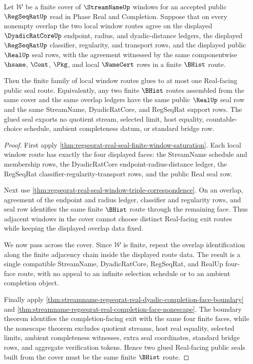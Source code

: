 \begin{theorem}
\label{thm:regseqrat-finite-cover-real-seal-gluing-uniqueness}
Let $\mathcal{W}$ be a finite cover of $\StreamNameUp$ windows for an
accepted public $\RegSeqRatUp$ read in Phase Real and Completion. Suppose
that on every nonempty overlap the two local window routes agree on the
displayed $\DyadicRatCoreUp$ endpoint, radius, and dyadic-distance ledgers,
the displayed $\RegSeqRatUp$ classifier, regularity, and transport rows, and
the displayed public $\RealUp$ seal rows, with the agreement witnessed by the
same componentwise $\hsame$, $\Cont$, $\Pkg$, and local $\NameCert$ rows in a
finite $\BHist$ route.

Then the finite family of local window routes glues to at most one
Real-facing public seal route. Equivalently, any two finite $\BHist$ routes
assembled from the same cover and the same overlap ledgers have the same
public $\RealUp$ seal row and the same StreamName, DyadicRatCore, and
RegSeqRat support rows. The glued seal exports no quotient stream, selected
limit, host equality, countable-choice schedule, ambient completeness datum,
or standard bridge row.
\end{theorem}
\begin{proof}
First apply
\autoref{thm:regseqrat-real-seal-finite-window-saturation}. Each local
window route has exactly the four displayed faces: the StreamName schedule
and membership rows, the DyadicRatCore endpoint-radius-distance ledger, the
RegSeqRat classifier-regularity-transport rows, and the public Real seal row.

Next use
\autoref{thm:regseqrat-real-seal-window-triple-correspondence}. On an
overlap, agreement of the endpoint and radius ledger, classifier and
regularity rows, and seal row identifies the same finite $\BHist$ route
through the remaining face. Thus adjacent windows in the cover cannot choose
distinct Real-facing exit routes while keeping the displayed overlap data
fixed.

We now pass across the cover. Since $\mathcal{W}$ is finite, repeat the
overlap identification along the finite adjacency chain inside the displayed
route data. The result is a single compatible StreamName, DyadicRatCore,
RegSeqRat, and RealUp four-face route, with no appeal to an infinite
selection schedule or to an ambient completion object.

Finally apply
\autoref{thm:streamname-regseqrat-real-dyadic-completion-face-boundary} and
\autoref{thm:streamname-regseqrat-real-completion-face-nonescape}. The
boundary theorem identifies the completion-facing exit with the same four
finite faces, while the nonescape theorem excludes quotient streams, host
real equality, selected limits, ambient completeness witnesses, extra seal
coordinates, standard bridge rows, and aggregate verification tokens. Hence
two glued Real-facing public seals built from the cover must be the same
finite $\BHist$ route.
\end{proof}


